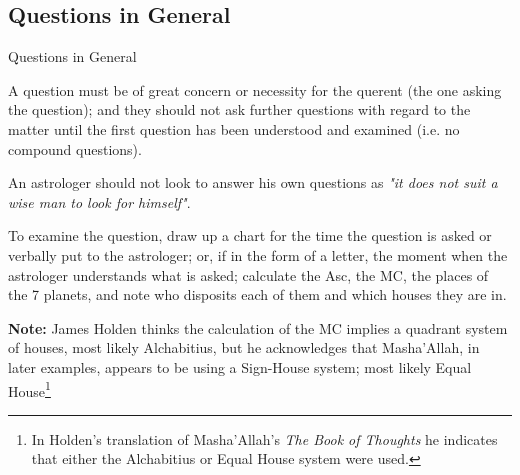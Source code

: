 \subsection{Questions in General}
\begin{frame}[t]{Questions in General}

A question must be of great concern or necessity for the querent (the one asking the question); and they should not ask further questions with regard to the matter until the first question has been understood and examined (i.e. no compound questions).

An astrologer should not look to answer his own questions as \textsl{"it does not suit a wise man to look for himself"}. 

To examine the question, draw up a chart for the time the question is asked or verbally put to the astrologer; or, if in the form of a letter, the moment when the astrologer understands what is asked; calculate the Asc, the MC, the places of the 7 planets, and note who disposits each of them and which houses they are in.
\vspace{0.5cm}
\begin{mdframed}[backgroundcolor=gray!5, rightmargin=2em, leftmargin=2em]
\textbf{Note:} James Holden thinks the calculation of the MC implies a quadrant system of houses, most likely Alchabitius, but he acknowledges that Masha'Allah, in later examples, appears to be using a Sign-House system; most likely Equal House\footnote{In Holden's translation of Masha'Allah's \textsl{The Book of Thoughts} he indicates that either the Alchabitius or Equal House system were used.}
\end{mdframed}

\end{frame}
